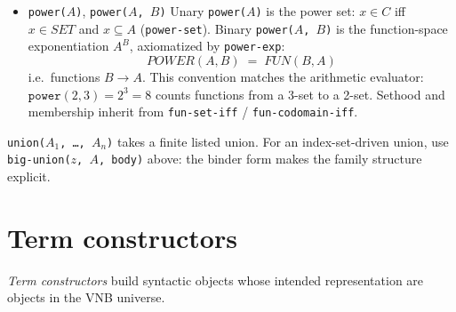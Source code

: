 \begin{itemize}
  \begin{remark}
  In the diverse VNB+ universe a set may contain non-sets (lists,
  numbers, functions).  The binder form $\mathit{BIG\text{-}UNION}(z, A,
  \mathit{body})$ makes the family structure explicit: $A$ is the
  index, $z \mapsto \mathit{body}$ is intended to be set-valued.
  The ZF-style $\bigcup S$ over a loose ``set of sets'' is the special
  case $\mathit{BIG\text{-}UNION}(s, S, s)$ and is not taken as
  primitive.
  \end{remark}

\item \texttt{power($A$)}, \texttt{power($A$, $B$)}
  Unary \texttt{power($A$)} is the power set: $x \in C$ iff
  $x \in \mathit{SET}$ and $x \subseteq A$ (\texttt{power-set}).
  Binary \texttt{power($A$, $B$)} is the function-space exponentiation
  $A^B$, axiomatized by \texttt{power-exp}:
  \[
     \mathit{POWER}(A, B) \;=\; \mathit{FUN}(B, A)
  \]
  i.e.\ functions $B \to A$.  This convention matches the arithmetic
  evaluator: $\texttt{power}(2, 3) = 2^3 = 8$ counts functions from
  a 3-set to a 2-set.  Sethood and membership inherit from
  \texttt{fun-set-iff} / \texttt{fun-codomain-iff}.

\end{itemize}

\begin{remark}
\texttt{union($A_1$, \ldots, $A_n$)} takes a finite listed union.
For an index-set-driven union, use \texttt{big-union($z$, $A$, body)}
above: the binder form makes the family structure explicit.
\end{remark}

\section{Term constructors}
\label{sec:choice-iota-lambda}

\emph{Term constructors} build syntactic objects whose intended
representation are objects in the VNB universe.

